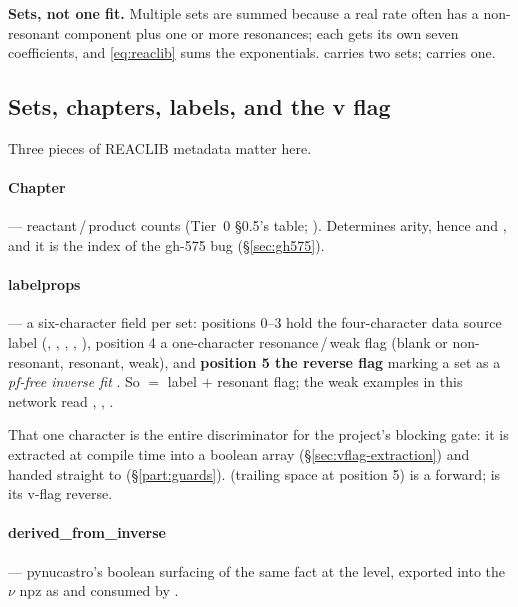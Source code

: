 \textbf{Sets, not one fit.} Multiple sets are summed because a real rate often
has a non-resonant component plus one or more resonances; each gets its own
seven coefficients, and \eqref{eq:reaclib} sums the exponentials.
 carries two sets;  carries one.

\subsection{Sets, chapters, labels, and the v flag}
\label{sec:labelprops}

Three pieces of REACLIB metadata matter here.

\paragraph{Chapter} --- reactant\,/\,product counts (Tier~0 \S0.5's table;
\citealp{cyburt2010}). Determines arity, hence  and
, and it is the index of the gh-575 bug (\S\ref{sec:gh575}).

\paragraph{labelprops} --- a six-character field per set: positions 0--3 hold
the four-character data source label (, , ,
, ), position 4 a one-character resonance\,/\,weak flag
(blank or  non-resonant,  resonant,  weak), and
\textbf{position 5 the reverse flag } marking a set as a \emph{pf-free
inverse fit} \citep{rauscher2000,cyburt2010}. So  $=$ label
 $+$ resonant flag; the weak examples in this network read
, , .

That one character is the entire discriminator for the project's blocking gate:
it is extracted at compile time into a boolean  array
(\S\ref{sec:vflag-extraction}) and handed straight to 
(\S\ref{part:guards}).  (trailing space at position 5) is a
forward;  is its v-flag reverse.

\paragraph{derived\_from\_inverse} --- pynucastro's boolean surfacing of the
same fact at the  level, exported into the $\nu$ npz as
 and consumed by .

